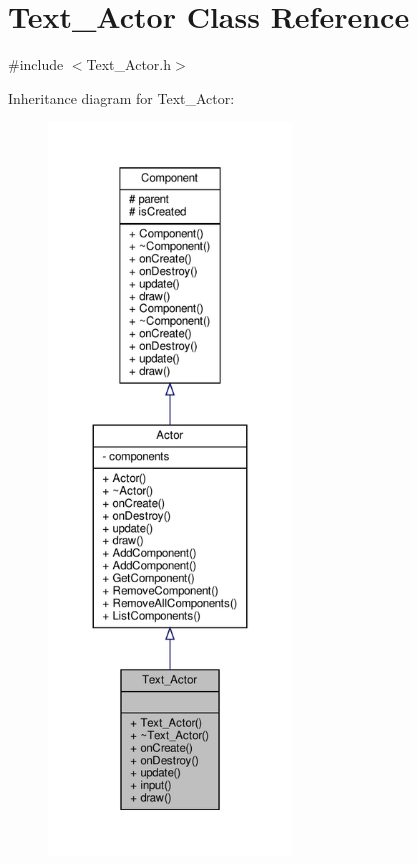 \hypertarget{classText__Actor}{}\section{Text\+\_\+\+Actor Class Reference}
\label{classText__Actor}


{\ttfamily \#include $<$Text\+\_\+\+Actor.\+h$>$}



Inheritance diagram for Text\+\_\+\+Actor\+:
\nopagebreak
\begin{figure}[H]
\begin{center}
\leavevmode
\includegraphics[height=550pt]{classText__Actor__inherit__graph}
\end{center}
\end{figure}


